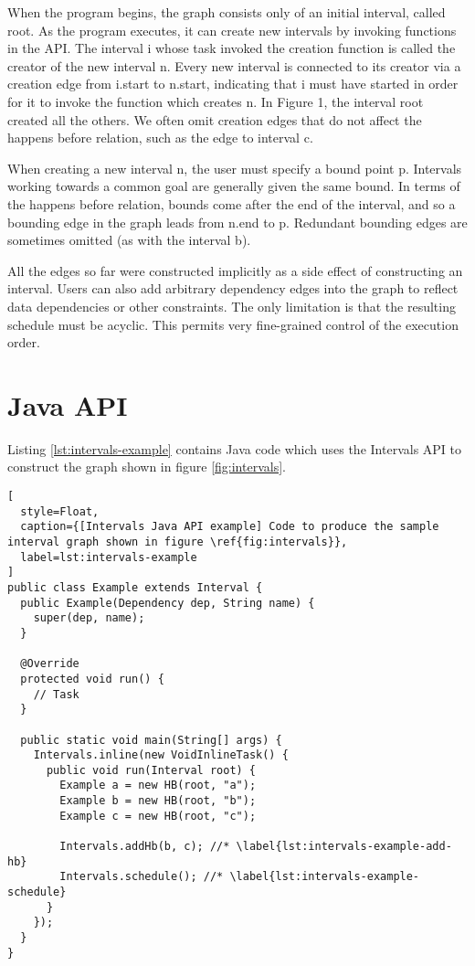 When the program begins, the graph consists only of an initial
interval, called root. As the program executes, it can create new
intervals by invoking functions in the API.  The interval i whose task
invoked the creation function is called the creator of the new
interval n. Every new interval is connected to its creator via a
creation edge from i.start to n.start, indicating that i must have
started in order for it to invoke the function which creates n. In
Figure 1, the interval root created all the others. We often omit
creation edges that do not affect the happens before relation, such as
the edge to interval c.

When creating a new interval n, the user must specify a bound point
p. Intervals working towards a common goal are generally given the
same bound. In terms of the happens before relation, bounds come after
the end of the interval, and so a bounding edge in the graph leads
from n.end to p.  Redundant bounding edges are sometimes omitted (as
with the interval b).

All the edges so far were constructed implicitly as a side effect of
constructing an interval. Users can also add arbitrary dependency
edges into the graph to reflect data dependencies or other
constraints. The only limitation is that the resulting schedule must
be acyclic. This permits very fine-grained control of the execution
order.

\section{Java API}
\label{sec:intervals-java-api}

Listing \ref{lst:intervals-example} contains Java code which uses the
Intervals API to construct the graph shown in figure
\ref{fig:intervals}.

\begin{lstlisting}[
  style=Float, 
  caption={[Intervals Java API example] Code to produce the sample interval graph shown in figure \ref{fig:intervals}},
  label=lst:intervals-example
]
public class Example extends Interval {
  public Example(Dependency dep, String name) {
    super(dep, name);
  }

  @Override
  protected void run() {
    // Task
  }
  
  public static void main(String[] args) {
    Intervals.inline(new VoidInlineTask() {
      public void run(Interval root) {
        Example a = new HB(root, "a");
        Example b = new HB(root, "b");
        Example c = new HB(root, "c");
        
        Intervals.addHb(b, c); //* \label{lst:intervals-example-add-hb}
        Intervals.schedule(); //* \label{lst:intervals-example-schedule}
      }
    });
  }
}
\end{lstlisting}

